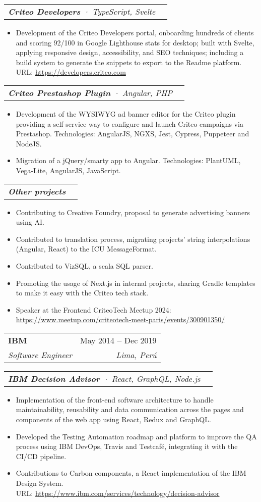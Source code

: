 \documentclass[letterpaper,11pt]{article}
\makeatletter
\newcommand{\resumeItem}[1]{
  \item\small{
    {#1 \vspace{-2pt}}
  }
}
\newcommand{\resumeSubheading}[4]{
  \vspace{-4pt}\item
    \begin{tabular*}{0.97\textwidth}[t]{l@{\extracolsep{\fill}}r}
      \textbf{#1} & \small#2 \\
      \textit{\small#3} & \textit{\small #4} \\
    \end{tabular*}\vspace{-7pt}
}
\newcommand{\resumeSubSubheading}[2]{
    \vspace{-2pt}\item
    \begin{tabular*}{0.97\textwidth}{l@{\extracolsep{\fill}}r}
      \textit{\small#1} & \textit{\small #2} \\
    \end{tabular*}\vspace{-7pt}
}
\newcommand{\resumeItemListStart}{\begin{itemize}}
\newcommand{\resumeItemListEnd}{\end{itemize}\vspace{-5pt}}
\makeatother
\begin{document}
    \resumeSubSubheading{\textbf{Criteo Developers} · TypeScript, Svelte }{}
      \resumeItemListStart
        \resumeItem{Development of the Criteo Developers portal, onboarding hundreds of clients and scoring 92/100 in Google Lighthouse stats for desktop; built with Svelte, applying responsive design, accessibility, and SEO techniques; including a build system to generate the snippets to export to the Readme platform.
        \\[1.5pt]
        URL: {\href{https://developers.criteo.com}{\color{blue}https://developers.criteo.com}}
        }
      \resumeItemListEnd

    \resumeSubSubheading{\textbf{Criteo Prestashop Plugin} · Angular, PHP}{}
      \resumeItemListStart
        \resumeItem{Development of the WYSIWYG ad banner editor for the Criteo plugin providing a self-service way to configure and launch Criteo campaigns via Prestashop. Technologies: AngularJS, NGXS, Jest, Cypress, Puppeteer and NodeJS.}
        \resumeItem{Migration of a jQuery/smarty app to Angular. Technologies: PlantUML, Vega-Lite, AngularJS, JavaScript.}
      \resumeItemListEnd

    \resumeSubSubheading{\textbf{Other projects} }{}
      \resumeItemListStart
        \resumeItem{Contributing to Creative Foundry, proposal to generate advertising banners using AI.}
        \resumeItem{Contributed to translation process, migrating projects' string interpolations (Angular, React) to the ICU MessageFormat.}
        \resumeItem{Contributed to VizSQL, a scala SQL parser.}
        \resumeItem{Promoting the usage of Next.js in internal projects, sharing Gradle templates to make it easy with the Criteo tech stack.}
        \resumeItem{Speaker at the Frontend CriteoTech Meetup 2024: {\href{https://www.meetup.com/criteotech-meet-paris/events/300901350/}{\color{blue}https://www.meetup.com/criteotech-meet-paris/events/300901350/}}}
      \resumeItemListEnd

    \resumeSubheading
    {IBM}{May 2014 \textbf{--} Dec 2019}
    {Software Engineer}{Lima, Perú}
    \vspace{8pt}

      \resumeSubSubheading{\textbf{IBM Decision Advisor}  · React, GraphQL, Node.js}{}
        \resumeItemListStart
          \resumeItem{Implementation of the front-end software architecture to handle maintainability, reusability and data communication across the pages and components of the web app using React, Redux and GraphQL.}
          \resumeItem{Developed the Testing Automation roadmap and platform to improve the QA process using IBM DevOps, Travis and Testcafé, integrating it with the CI/CD pipeline.}
          \resumeItem{Contributions to Carbon components, a React implementation of the IBM Design System.
          \\[1.5pt] URL: {\href{https://www.ibm.com/services/technology/decision-advisor}{\color{blue}https://www.ibm.com/services/technology/decision-advisor}}
          }
        \resumeItemListEnd
\end{document}
